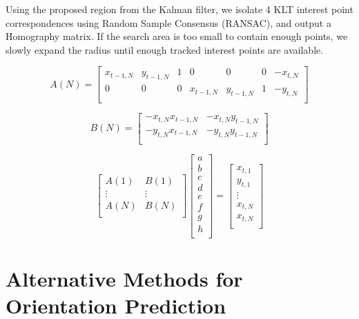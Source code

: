 \documentclass[letterpaper,10pt,conference]{IEEEtran}
\begin{document}
Using the proposed region from the Kalman filter, we isolate 4 KLT interest point correspondences using Random Sample Consensus (RANSAC), and output a Homography matrix. If the search area is too small to contain enough points, we slowly expand the radius until enough tracked interest points are available.

\begin{equation}
A(N) = 
\begin{bmatrix}
x_{t-1,N}& y_{t-1,N}&1&0&0&0& -x_{t,N}\\
0&0&0&x_{t-1,N}& y_{t-1,N}&1& -y_{t,N}\\
\end{bmatrix}
\end{equation}

\begin{equation}
B(N) = 
\begin{bmatrix}
-x_{t,N}x_{t-1,N}& -x_{t,N}y_{t-1,N}\\
-y_{t,N}x_{t-1,N} &-y_{t,N}y_{t-1,N}\\
\end{bmatrix}
\end{equation}


\begin{equation}
\begin{bmatrix}
A(1)& B(1)\\
\vdots&\vdots\\
A(N)& B(N) \\
\end{bmatrix}
\begin{bmatrix}
a\\
b\\
c\\
d\\
e\\
f\\
g\\
h\\
\end{bmatrix} = 
\begin{bmatrix}
x_{t,1}\\
y_{t,1}\\
\vdots\\
x_{t,N}\\
x_{t,N}\\
\end{bmatrix}
\end{equation}



\section{Alternative Methods for Orientation Prediction}
\end{document}
